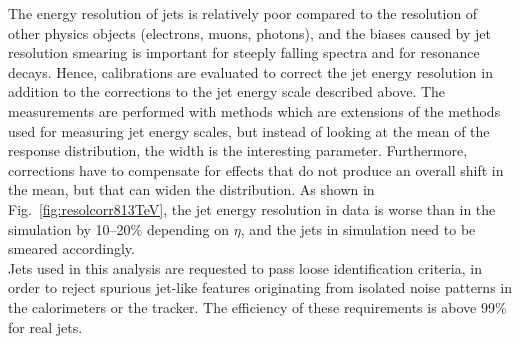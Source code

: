 The energy resolution of jets is relatively poor compared to the resolution of other physics objects (electrons, muons, photons), and the biases caused by jet resolution smearing is important for steeply falling spectra and for resonance decays. Hence, calibrations are evaluated to correct the jet energy resolution in addition to the corrections to the jet energy scale described above. The measurements are performed with methods which are extensions of the methods used for measuring jet energy scales, but instead of looking at the mean of the response distribution, the width is the interesting parameter. Furthermore, corrections have to compensate for effects that do not produce an overall shift in the mean, but that can widen the distribution. As shown in Fig.~\ref{fig:resolcorr813TeV}, the jet energy resolution in data is worse than in the simulation by 10--20\% depending on $\eta$, and the jets in simulation need to be smeared accordingly.\\

Jets used in this analysis are requested to pass loose identification criteria, in order to reject spurious jet-like features originating from isolated noise patterns in the calorimeters or the tracker. The efficiency of these requirements is above 99\% for real jets. 

